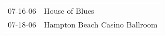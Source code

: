 \begin{supertabular}{p{0.07\textwidth}p{0.23\textwidth}}
 07-16-06 &                 House of Blues \\
 07-18-06 &  Hampton Beach Casino Ballroom \\
\end{supertabular}
